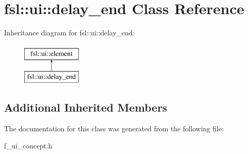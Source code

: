 \hypertarget{classfsl_1_1ui_1_1delay__end}{}\section{fsl\+::ui\+::delay\+\_\+end Class Reference}
\label{classfsl_1_1ui_1_1delay__end}
Inheritance diagram for fsl\+::ui\+::delay\+\_\+end\+:\begin{figure}[H]
\begin{center}
\leavevmode
\includegraphics[height=2.000000cm]{classfsl_1_1ui_1_1delay__end}
\end{center}
\end{figure}
\subsection*{Additional Inherited Members}


The documentation for this class was generated from the following file\+:\begin{DoxyCompactItemize}
\item 
f\+\_\+ui\+\_\+concept.\+h\end{DoxyCompactItemize}
